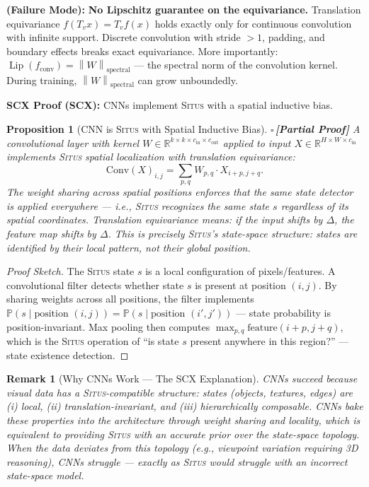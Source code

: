 \documentclass[12pt,a4paper]{article}
\newtheorem{proposition}[theorem]{Proposition}
\newtheorem{remark}[theorem]{Remark}
\theoremstyle{definition}
\newcommand{\rigorPartial}{{\color{rigorcolor}$\square$\,\textbf{[Partial Proof]}}}
\newcommand{\Situs}{\textsc{Situs}}
\DeclareMathOperator{\Lip}{Lip}
\newcommand{\R}{\mathbb{R}}
\newcommand{\Pbb}{\mathbb{P}}
\newcommand{\norm}[1]{\left\lVert#1\right\rVert}
\newcommand{\whyFail}{\noindent\textbf{ (Failure Mode):} }
\newcommand{\scxProof}{\noindent\textbf{SCX Proof (SCX):} }
\begin{document}
\whyFail{} \textbf{No Lipschitz guarantee on the equivariance.} Translation equivariance $f(T_v x) = T_v f(x)$ holds exactly only for continuous convolution with infinite support. Discrete convolution with stride $>1$, padding, and boundary effects breaks exact equivariance. More importantly: $\Lip(f_{\text{conv}}) = \norm{W}_{\text{spectral}}$ — the spectral norm of the convolution kernel. During training, $\norm{W}_{\text{spectral}}$ can grow unboundedly.

\scxProof{} CNNs implement \Situs{} with a spatial inductive bias.

\begin{proposition}[CNN is \Situs{} with Spatial Inductive Bias]\label{prop:cnn_situs}
\rigorPartial
A convolutional layer with kernel $W \in \R^{k \times k \times c_{\text{in}} \times c_{\text{out}}}$ applied to input $X \in \R^{H \times W \times c_{\text{in}}}$ implements \Situs{} spatial localization with translation equivariance:
\begin{equation}\label{eq:cnn_situs}
    \text{Conv}(X)_{i,j} = \sum_{p,q} W_{p,q} \cdot X_{i+p, j+q}.
\end{equation}
The weight sharing across spatial positions enforces that the same state detector is applied everywhere — i.e., \Situs{} recognizes the same state $s$ regardless of its spatial coordinates. Translation equivariance means: if the input shifts by $\Delta$, the feature map shifts by $\Delta$. This is precisely \Situs{}'s state-space structure: states are identified by their \emph{local pattern}, not their global position.
\end{proposition}

\begin{proof}[Proof Sketch]
The \Situs{} state $s$ is a local configuration of pixels/features. A convolutional filter detects whether state $s$ is present at position $(i,j)$. By sharing weights across all positions, the filter implements $\Pbb(s \mid \text{position } (i,j)) = \Pbb(s \mid \text{position } (i',j'))$ — state probability is position-invariant. Max pooling then computes $\max_{p,q} \text{feature}(i+p, j+q)$, which is the \Situs{} operation of ``is state $s$ present anywhere in this region?'' — state existence detection.
\end{proof}

\begin{remark}[Why CNNs Work — The SCX Explanation]
CNNs succeed because visual data has a \Situs{}-compatible structure: states (objects, textures, edges) are (i) local, (ii) translation-invariant, and (iii) hierarchically composable. CNNs bake these properties into the architecture through weight sharing and locality, which is equivalent to providing \Situs{} with an accurate prior over the state-space topology. When the data deviates from this topology (e.g., viewpoint variation requiring 3D reasoning), CNNs struggle — exactly as \Situs{} would struggle with an incorrect state-space model.
\end{remark}
\end{document}
